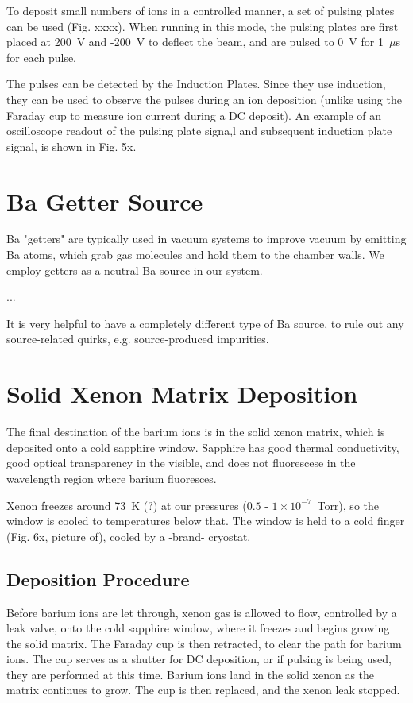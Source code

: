 To deposit small numbers of ions in a controlled manner, a set of pulsing plates can be used (Fig. xxxx).  When running in this mode, the pulsing plates are first placed at 200~V and -200~V to deflect the beam, and are pulsed to 0~V for 1~$\mu$s for each pulse.  

The pulses can be detected by the Induction Plates.  Since they use induction, they can be used to observe the pulses during an ion deposition (unlike using the Faraday cup to measure ion current during a DC deposit).  An example of an oscilloscope readout of the pulsing plate signa,l and subsequent induction plate signal, is shown in Fig. 5x.

\section{Ba Getter Source}

Ba "getters" are typically used in vacuum systems to improve vacuum by emitting Ba atoms, which grab gas molecules and hold them to the chamber walls.  We employ getters as a neutral Ba source in our system.

...

It is very helpful to have a completely different type of Ba source, to rule out any source-related quirks, e.g. source-produced impurities.

\section{Solid Xenon Matrix Deposition}

The final destination of the barium ions is in the solid xenon matrix, which is deposited onto a cold sapphire window.  Sapphire has good thermal conductivity, good optical transparency in the visible, and does not fluorescese in the wavelength region where barium fluoresces.  

Xenon freezes around 73~K (?) at our pressures ($0.5$ - $1 \times 10^{-7}$~Torr), so the window is cooled to temperatures below that.  The window is held to a cold finger (Fig. 6x, picture of), cooled by a -brand- cryostat. %

\subsection{Deposition Procedure}

Before barium ions are let through, xenon gas is allowed to flow, controlled by a leak valve, onto the cold sapphire window, where it freezes and begins growing the solid matrix.  The Faraday cup is then retracted, to clear the path for barium ions.  The cup serves as a shutter for DC deposition, or if pulsing is being used, they are performed at this time.  Barium ions land in the solid xenon as the matrix continues to grow.  The cup is then replaced, and the xenon leak stopped.